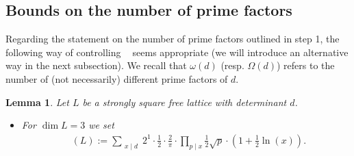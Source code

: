 \documentclass{amsart}
\newtheorem{lem}[thm]{Lemma}
\theoremstyle{definition}
\theoremstyle{remark}
\DeclareMathOperator{\mref}{m_{ref}}
\DeclareMathOperator{\Mref}{M_{ref}}
\begin{document}
\subsection{Bounds on the number of prime factors}
Regarding the statement on the number of prime factors outlined in step 1, the following way of controlling $\mref$ seems appropriate
(we will introduce an alternative way in the next subsection).
We recall that $\omega(d)$ (resp. $\Omega(d)$) refers to the number of (not necessarily) different prime factors of $d$.
\begin{lem}
 Let $L$ be a strongly square free lattice with determinant $d$.
 \begin{itemize}

  \item[a)] For $\dim L = 3$ we set
    \begin{align*}
     \Mref(L):=\sum_{\substack{x \mid d}}2^1 \cdot \frac{1}{2} \cdot \frac{2}{\pi} \cdot \prod_{p \mid x}\frac{1}{2}\sqrt{p} \cdot \left(1+\frac{1}{2}\ln(x)\right).
    \end{align*}


\end{itemize}
\end{lem}
\end{document}
